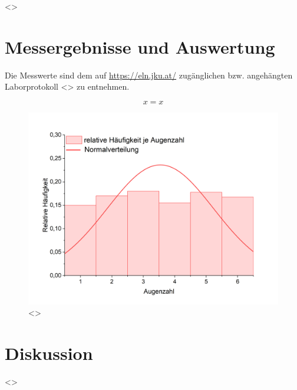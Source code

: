 \documentclass[a4paper,12pt]{article}
\begin{document}
<>

\section{Messergebnisse und Auswertung}

Die Messwerte sind dem auf \url{https://eln.jku.at/} zugänglichen bzw. angehängten Laborprotokoll \glqq <>\grqq{} zu entnehmen.         %


\begin{equation}
    \label{Gl1}
    x = x
\end{equation}

\vspace{0,5cm}


\begin{figure}[H]
    \label{AbbAuswertung1}
    \centering
    \includegraphics[width=\textwidth]{bilder/Diagramm1.png}        %
    \caption{<>}                                                    %
\end{figure}

\section{Diskussion}

<>
\end{document}
